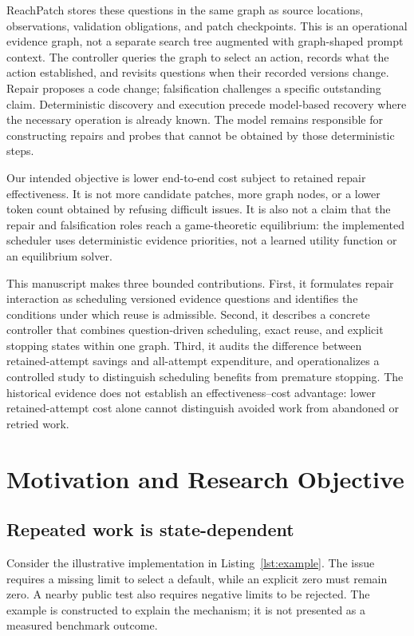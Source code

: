 \documentclass[acmsmall,screen,review,anonymous]{acmart}
\newcommand{\system}{ReachPatch}
\begin{document}
\system{} stores these questions in the same graph as source locations, observations, validation obligations, and patch checkpoints. This is an operational evidence graph, not a separate search tree augmented with graph-shaped prompt context. The controller queries the graph to select an action, records what the action established, and revisits questions when their recorded versions change. Repair proposes a code change; falsification challenges a specific outstanding claim. Deterministic discovery and execution precede model-based recovery where the necessary operation is already known. The model remains responsible for constructing repairs and probes that cannot be obtained by those deterministic steps.

Our intended objective is lower end-to-end cost subject to retained repair effectiveness. It is not more candidate patches, more graph nodes, or a lower token count obtained by refusing difficult issues. It is also not a claim that the repair and falsification roles reach a game-theoretic equilibrium: the implemented scheduler uses deterministic evidence priorities, not a learned utility function or an equilibrium solver.

This manuscript makes three bounded contributions. First, it formulates repair interaction as scheduling versioned evidence questions and identifies the conditions under which reuse is admissible. Second, it describes a concrete controller that combines question-driven scheduling, exact reuse, and explicit stopping states within one graph. Third, it audits the difference between retained-attempt savings and all-attempt expenditure, and operationalizes a controlled study to distinguish scheduling benefits from premature stopping. The historical evidence does not establish an effectiveness--cost advantage: lower retained-attempt cost alone cannot distinguish avoided work from abandoned or retried work.

\section{Motivation and Research Objective}
\subsection{Repeated work is state-dependent}
Consider the illustrative implementation in Listing~\ref{lst:example}. The issue requires a missing limit to select a default, while an explicit zero must remain zero. A nearby public test also requires negative limits to be rejected. The example is constructed to explain the mechanism; it is not presented as a measured benchmark outcome.
\end{document}
